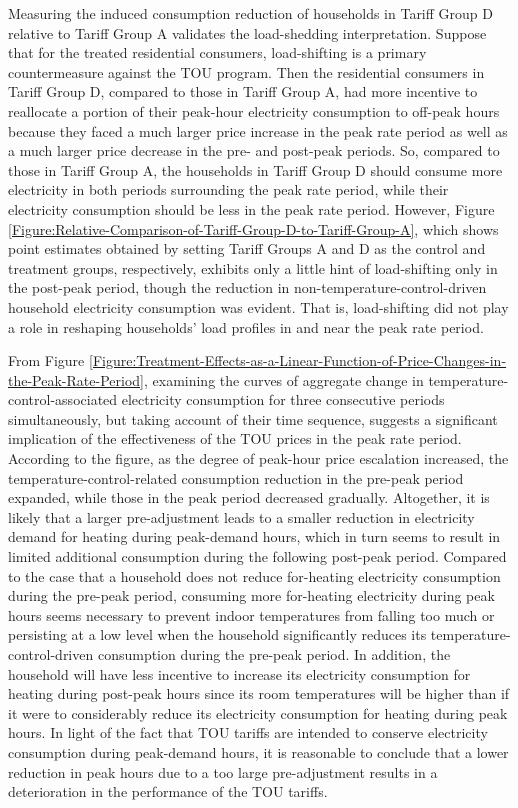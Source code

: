 Measuring the induced consumption reduction of households in Tariff Group D relative to Tariff Group A validates the load-shedding interpretation. Suppose that for the treated residential consumers, load-shifting is a primary countermeasure against the TOU program. Then the residential consumers in Tariff Group D, compared to those in Tariff Group A, had more incentive to reallocate a portion of their peak-hour electricity consumption to off-peak hours because they faced a much larger price increase in the peak rate period as well as a much larger price decrease in the pre- and post-peak periods. So, compared to those in Tariff Group A, the households in Tariff Group D should consume more electricity in both periods surrounding the peak rate period, while their electricity consumption should be less in the peak rate period. However, Figure \ref{Figure:Relative-Comparison-of-Tariff-Group-D-to-Tariff-Group-A}, which shows point estimates obtained by setting Tariff Groups A and D as the control and treatment groups, respectively, exhibits only a little hint of load-shifting only in the post-peak period, though the reduction in non-temperature-control-driven household electricity consumption was evident. That is, load-shifting did not play a role in reshaping households' load profiles in and near the peak rate period. 

From Figure \ref{Figure:Treatment-Effects-as-a-Linear-Function-of-Price-Changes-in-the-Peak-Rate-Period}, examining the curves of aggregate change in temperature-control-associated electricity consumption for three consecutive periods simultaneously, but taking account of their time sequence, suggests a significant implication of the effectiveness of the TOU prices in the peak rate period. According to the figure, as the degree of peak-hour price escalation increased, the temperature-control-related consumption reduction in the pre-peak period expanded, while those in the peak period decreased gradually. Altogether, it is likely that a larger pre-adjustment leads to a smaller reduction in electricity demand for heating during peak-demand hours, which in turn seems to result in limited additional consumption during the following post-peak period. Compared to the case that a household does not reduce for-heating electricity consumption during the pre-peak period, consuming more for-heating electricity during peak hours seems necessary to prevent indoor temperatures from falling too much or persisting at a low level when the household significantly reduces its temperature-control-driven consumption during the pre-peak period.
In addition, the household will have less incentive to increase its electricity consumption for heating during post-peak hours since its room temperatures will be higher than if it were to considerably reduce its electricity consumption for heating during peak hours. In light of the fact that TOU tariffs are intended to conserve electricity consumption during peak-demand hours, it is reasonable to conclude that a lower reduction in peak hours due to a too large pre-adjustment results in a deterioration in the performance of the TOU tariffs.
